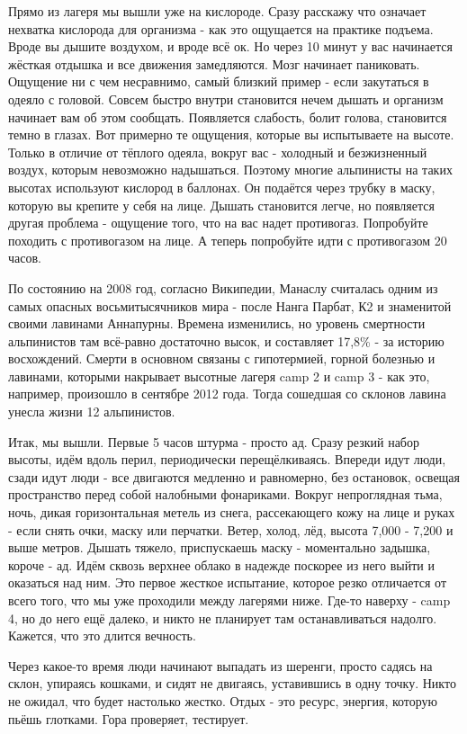 Прямо из лагеря мы вышли уже на кислороде. Сразу расскажу что означает нехватка
кислорода для организма - как это ощущается на практике подъема. Вроде вы
дышите воздухом, и вроде всё ок. Но через 10 минут у вас начинается жёсткая
отдышка и все движения замедляются. Мозг начинает паниковать. Ощущение ни с чем
несравнимо, самый близкий пример - если закутаться в одеяло с головой. Совсем
быстро внутри становится нечем дышать и организм начинает вам об этом сообщать.
Появляется слабость, болит голова, становится темно в глазах. Вот примерно те
ощущения, которые вы испытываете на высоте. Только в отличие от тёплого одеяла,
вокруг вас - холодный и безжизненный воздух, которым невозможно надышаться.
Поэтому многие альпинисты на таких высотах используют кислород в баллонах. Он
подаётся через трубку в маску, которую вы крепите у себя на лице. Дышать
становится легче, но появляется другая проблема - ощущение того, что на вас
надет противогаз. Попробуйте походить с противогазом на лице. А теперь
попробуйте идти с противогазом 20 часов. 

По состоянию на 2008 год, согласно Википедии, Манаслу считалась одним из самых
опасных восьмитысячников мира - после Нанга Парбат, К2 и знаменитой своими
лавинами Аннапурны. Времена изменились, но уровень смертности альпинистов там
всё-равно достаточно высок, и составляет 17,8\% - за историю восхождений. Смерти
в основном связаны с гипотермией, горной болезнью и лавинами, которыми
накрывает высотные лагеря camp 2 и camp 3 - как это, например, произошло в
сентябре 2012 года. Тогда сошедшая со склонов лавина унесла жизни 12
альпинистов. 

Итак, мы вышли. Первые 5 часов штурма - просто ад. Сразу резкий набор высоты,
идём вдоль перил, периодически перещёлкиваясь. Впереди идут люди, сзади идут
люди - все двигаются медленно и равномерно, без остановок, освещая пространство
перед собой налобными фонариками. Вокруг непроглядная тьма, ночь, дикая
горизонтальная метель из снега, рассекающего кожу на лице и руках - если снять
очки, маску или перчатки. Ветер, холод, лёд, высота 7,000 - 7,200 и выше
метров. Дышать тяжело, приспускаешь маску - моментально задышка, короче - ад.
Идём сквозь верхнее облако в надежде поскорее из него выйти и оказаться над
ним. Это первое жесткое испытание, которое резко отличается от всего того, что
мы уже проходили между лагерями ниже. Где-то наверху - camp 4, но до него ещё
далеко, и никто не планирует там останавливаться надолго. Кажется, что это
длится вечность. 

Через какое-то время люди начинают выпадать из шеренги, просто садясь на склон,
упираясь кошками, и сидят не двигаясь, уставившись в одну точку. Никто не
ожидал, что будет настолько жестко. Отдых - это ресурс, энергия, которую пьёшь
глотками. Гора проверяет, тестирует. 


